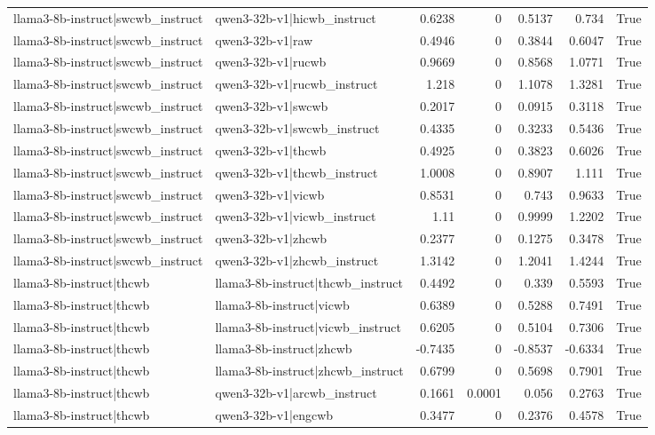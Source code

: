 \begin{table}
\begin{tabular}{l l r r r r l}
llama3-8b-instruct|swcwb_instruct & qwen3-32b-v1|hicwb_instruct & 0.6238 & 0 & 0.5137 & 0.734 & True \\
llama3-8b-instruct|swcwb_instruct & qwen3-32b-v1|raw & 0.4946 & 0 & 0.3844 & 0.6047 & True \\
llama3-8b-instruct|swcwb_instruct & qwen3-32b-v1|rucwb & 0.9669 & 0 & 0.8568 & 1.0771 & True \\
llama3-8b-instruct|swcwb_instruct & qwen3-32b-v1|rucwb_instruct & 1.218 & 0 & 1.1078 & 1.3281 & True \\
llama3-8b-instruct|swcwb_instruct & qwen3-32b-v1|swcwb & 0.2017 & 0 & 0.0915 & 0.3118 & True \\
llama3-8b-instruct|swcwb_instruct & qwen3-32b-v1|swcwb_instruct & 0.4335 & 0 & 0.3233 & 0.5436 & True \\
llama3-8b-instruct|swcwb_instruct & qwen3-32b-v1|thcwb & 0.4925 & 0 & 0.3823 & 0.6026 & True \\
llama3-8b-instruct|swcwb_instruct & qwen3-32b-v1|thcwb_instruct & 1.0008 & 0 & 0.8907 & 1.111 & True \\
llama3-8b-instruct|swcwb_instruct & qwen3-32b-v1|vicwb & 0.8531 & 0 & 0.743 & 0.9633 & True \\
llama3-8b-instruct|swcwb_instruct & qwen3-32b-v1|vicwb_instruct & 1.11 & 0 & 0.9999 & 1.2202 & True \\
llama3-8b-instruct|swcwb_instruct & qwen3-32b-v1|zhcwb & 0.2377 & 0 & 0.1275 & 0.3478 & True \\
llama3-8b-instruct|swcwb_instruct & qwen3-32b-v1|zhcwb_instruct & 1.3142 & 0 & 1.2041 & 1.4244 & True \\
llama3-8b-instruct|thcwb & llama3-8b-instruct|thcwb_instruct & 0.4492 & 0 & 0.339 & 0.5593 & True \\
llama3-8b-instruct|thcwb & llama3-8b-instruct|vicwb & 0.6389 & 0 & 0.5288 & 0.7491 & True \\
llama3-8b-instruct|thcwb & llama3-8b-instruct|vicwb_instruct & 0.6205 & 0 & 0.5104 & 0.7306 & True \\
llama3-8b-instruct|thcwb & llama3-8b-instruct|zhcwb & -0.7435 & 0 & -0.8537 & -0.6334 & True \\
llama3-8b-instruct|thcwb & llama3-8b-instruct|zhcwb_instruct & 0.6799 & 0 & 0.5698 & 0.7901 & True \\
llama3-8b-instruct|thcwb & qwen3-32b-v1|arcwb_instruct & 0.1661 & 0.0001 & 0.056 & 0.2763 & True \\
llama3-8b-instruct|thcwb & qwen3-32b-v1|engcwb & 0.3477 & 0 & 0.2376 & 0.4578 & True \\

\end{tabular}
\end{table}
